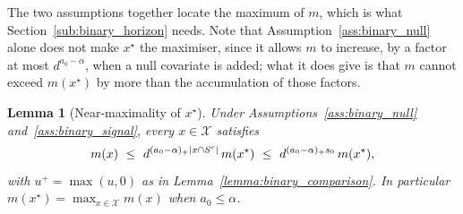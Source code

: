 \documentclass[aos]{imsart}%
\DeclarePairedDelimiter{\abs}{\lvert}{\rvert}
\newcommand{\ambientspace}[0]{\mathcal{X}}
\theoremstyle{plain}
\newtheorem{lemma}[theorem]{Lemma}
\theoremstyle{definition}
\begin{document}
    The two assumptions together locate the maximum of $m$, which is what
    Section~\ref{sub:binary_horizon} needs. Note that
    Assumption~\ref{ass:binary_null} alone does not make $x^{\star}$ the
    maximiser, since it allows $m$ to increase, by a factor at most
    $d^{a_0-\alpha}$, when a null covariate is added; what it does give is
    that $m$ cannot exceed $m(x^{\star})$ by more than the accumulation of
    those factors.

    \begin{lemma}[Near-maximality of $x^{\star}$]
        \label{lemma:binary_max}
        Under Assumptions~\ref{ass:binary_null} and~\ref{ass:binary_signal},
        every $x\in\ambientspace$ satisfies
        \begin{equation}
            \label{eq:binary_nearmax}
            m(x)\ \leq\ d^{(a_0-\alpha)_{+}\abs{x\cap S^{c}}}\,m(x^{\star})
            \ \leq\ d^{(a_0-\alpha)_{+}s_0}\,m(x^{\star}),
        \end{equation}
        with $u^{+}=\max(u,0)$ as in Lemma~\ref{lemma:binary_comparison}. In
        particular $m(x^{\star})=\max_{x\in\ambientspace}m(x)$ when
        $a_0\leq\alpha$.
    \end{lemma}
\end{document}
